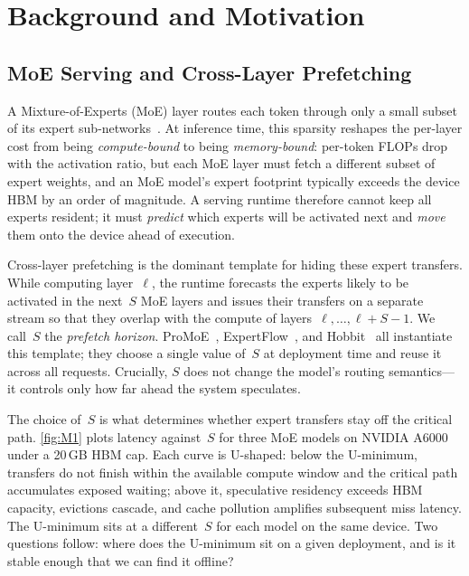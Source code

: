 \section{Background and Motivation}
\label{sec:bg-motivation}

\subsection{MoE Serving and Cross-Layer Prefetching}

\noindent
A Mixture-of-Experts (MoE) layer routes each token through only a small subset of its expert sub-networks~\cite{shazeer2017outrageously, fedus2021switch, yang2024xmoe, chen2022towards, zhou2022mixture}. At inference time, this sparsity reshapes the per-layer cost from being \emph{compute-bound} to being \emph{memory-bound}: per-token FLOPs drop with the activation ratio, but each MoE layer must fetch a different subset of expert weights, and an MoE model's expert footprint typically exceeds the device HBM by an order of magnitude. A serving runtime therefore cannot keep all experts resident; it must \emph{predict} which experts will be activated next and \emph{move} them onto the device ahead of execution.

\smallskip
\noindent
Cross-layer prefetching is the dominant template for hiding these expert transfers. While computing layer~$\ell$, the runtime forecasts the experts likely to be activated in the next~$S$ MoE layers and issues their transfers on a separate stream so that they overlap with the compute of layers~$\ell, \ldots, \ell{+}S{-}1$. We call~$S$ the \emph{prefetch horizon}. ProMoE~\cite{song2024promoe}, ExpertFlow~\cite{he2024expertflow}, and Hobbit~\cite{tang2024hobbit} all instantiate this template; they choose a single value of~$S$ at deployment time and reuse it across all requests. Crucially, $S$ does not change the model's routing semantics---it controls only how far ahead the system speculates.

\smallskip
\noindent
The choice of~$S$ is what determines whether expert transfers stay off the critical path. \autoref{fig:M1} plots latency against~$S$ for three MoE models on NVIDIA A6000 under a 20\,GB HBM cap. Each curve is U-shaped: below the U-minimum, transfers do not finish within the available compute window and the critical path accumulates exposed waiting; above it, speculative residency exceeds HBM capacity, evictions cascade, and cache pollution amplifies subsequent miss latency. The U-minimum sits at a different~$S$ for each model on the same device. Two questions follow: where does the U-minimum sit on a given deployment, and is it stable enough that we can find it offline?

